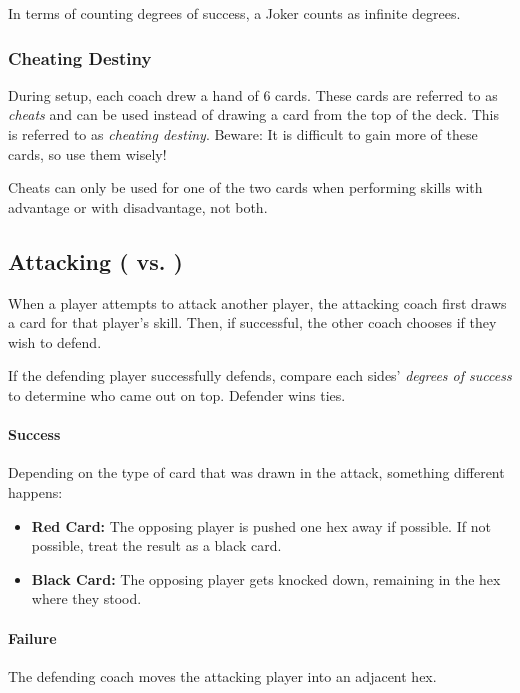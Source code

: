 \begin{note}
    In terms of counting degrees of success, a Joker counts as infinite degrees.
\end{note}

\subsubsection{Cheating Destiny}
During setup, each coach drew a hand of 6 cards.
These cards are referred to as \textit{cheats} and can be used instead of drawing a card from the top of the deck. This is referred to as \textit{cheating destiny}.
Beware: It is difficult to gain more of these cards, so use them wisely!

\begin{note}
    Cheats can only be used for one of the two cards when performing skills with advantage or with disadvantage, not both.
\end{note}

\subsection{Attacking (\strength{} vs. \strength{})}
When a player attempts to attack another player, the attacking coach first draws a card for that player's \strength{} skill.
Then, if successful, the other coach chooses if they wish to defend.

If the defending player successfully defends, compare each sides' \textit{degrees of success} to determine who came out on top. Defender wins ties.

\paragraph{Success}
Depending on the type of card that was drawn in the attack, something different happens:
\begin{itemize}
    \item \textbf{Red Card:} The opposing player is pushed one hex away if possible. If not possible, treat the result as a black card.
    \item \textbf{Black Card:} The opposing player gets knocked down, remaining in the hex where they stood.
\end{itemize}
\paragraph{Failure}
The defending coach moves the attacking player into an adjacent hex.
